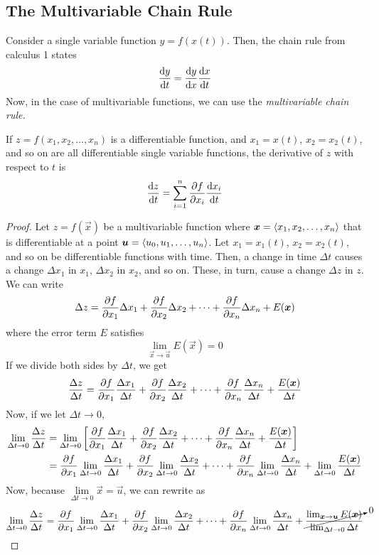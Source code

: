 \subsection{The Multivariable Chain Rule}
Consider a single variable function \(y=f(x(t))\). Then, the chain rule from calculus 1 states
\[ \dv{y}{t} = \dv{y}{x}\dv{x}{t} \]
Now, in the case of multivariable functions, we can use the \it{multivariable chain rule}.
\begin{theorem}
    If \(z=f(x_1, x_2, \dots, x_n)\) is a differentiable function, and \(x_1=x(t)\), \(x_2=x_2(t)\), and so on are all differentiable single variable functions, the derivative of \(z\) with respect to \(t\) is 
    \[ \dv{z}{t} = \sum_{i=1}^n\pdv{f}{x_i}\dv{x_i}{t} \]
\end{theorem}
\begin{proof}
    Let \(z=f(\vec x)\) be a multivariable function where \(\boldsymbol{x} = \left\langle x_1, x_2, \dots, x_n \right\rangle\) that is differentiable at a point \(\boldsymbol{u} = \left\langle u_0, u_1, \dots, u_n \right\rangle\). Let \(x_1=x_1(t)\), \(x_2=x_2(t)\), and so on be differentiable functions with time. Then, a change in time \( \Delta t\) causes a change \(\Delta x_1\) in \(x_1\), \(\Delta x_2\) in \(x_2\), and so on. These, in turn, cause a change \(\Delta z\) in \(z\). We can write
    \[ \Delta z = \pdv{f}{x_1}\Delta x_1 + \pdv{f}{x_2}\Delta x_2 + \dots + \pdv{f}{x_n}\Delta x_n  + E(\boldsymbol{x}) \]
    where the error term \(E\) satisfies
    \[ \lim_{\vec x\to \vec u}E(\vec x) = 0\]
    If we divide both sides by \(\Delta t\), we get
    \[ \frac{\Delta z}{\Delta t} = \pdv{f}{x_1}\frac{\Delta x_1}{\Delta t} + \pdv{f}{x_2}\frac{\Delta x_2}{\Delta t} + \dots + \pdv{f}{x_n}\frac{\Delta x_n}{\Delta t} + \frac{E(\boldsymbol{x})}{\Delta t} \]
    Now, if we let \(\Delta t\to 0\), 
    \begin{align*} \lim_{\Delta t\to 0}\frac{\Delta z}{\Delta t} &= \lim_{\Delta t\to 0}\bqty{\pdv{f}{x_1}\frac{\Delta x_1}{\Delta t} + \pdv{f}{x_2}\frac{\Delta x_2}{\Delta t} + \dots + \pdv{f}{x_n}\frac{\Delta x_n}{\Delta t} + \frac{E(\vec x)}{\Delta t}} \\
    &= \pdv{f}{x_1}\lim_{\Delta t\to 0}\frac{\Delta x_1}{\Delta t} + \pdv{f}{x_2}\lim_{\Delta t\to 0}\frac{\Delta x_2}{\Delta t} + \dots + \pdv{f}{x_n}\lim_{\Delta t \to 0}\frac{\Delta x_n}{\Delta t} + \lim_{\Delta t\to 0}\frac{E(\vec x)}{\Delta t}
    \end{align*}
    Now, because \(\lim\limits_{\Delta t\to 0}\vec x = \vec u\), we can rewrite as
    \begin{align*}
        \lim_{\Delta t\to 0}\frac{\Delta z}{\Delta t} &= \pdv{f}{x_1}\lim_{\Delta t\to 0}\frac{\Delta x_1}{\Delta t} + \pdv{f}{x_2}\lim_{\Delta t\to 0}\frac{\Delta x_2}{\Delta t} + \dots + \pdv{f}{x_n}\lim_{\Delta t \to 0}\frac{\Delta x_n}{\Delta t} + \cancelto{0}{\frac{\lim_{\vec x\to\vec u}E(\vec x)}{\lim_{\Delta t\to 0}\Delta t}} \\

\end{align*}
\end{proof}
